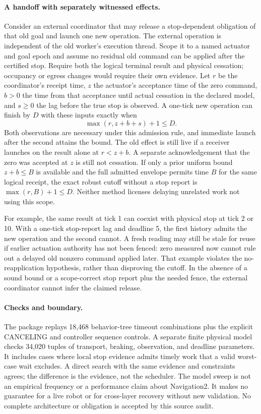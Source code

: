 \documentclass{article}
\begin{document}
\paragraph{A handoff with separately witnessed effects.}
Consider an external coordinator that may release a stop-dependent obligation of that old goal and launch one new operation. The external operation is independent of the old worker's execution thread. Scope it to a named actuator and goal epoch and assume no residual old command can be applied after the certified stop. Require both the logical terminal result and physical cessation; occupancy or egress changes would require their own evidence. Let \(r\) be the coordinator's receipt time, \(z\) the actuator's acceptance time of the zero command, \(b>0\) the time from that acceptance until actual cessation in the declared model, and \(s\ge0\) the lag before the true stop is observed. A one-tick new operation can finish by \(D\) with these inputs exactly when
\[
  \max(r,z+b+s)+1\le D.
\]
Both observations are necessary under this admission rule, and immediate launch after the second attains the bound. The old effect is still live if a receiver launches on the result alone at \(r<z+b\). A separate acknowledgement that the zero was accepted at \(z\) is still not cessation. If only a prior uniform bound \(z+b\le B\) is available and the full admitted envelope permits time \(B\) for the same logical receipt, the exact robust cutoff without a stop report is \(\max(r,B)+1\le D\). Neither method licenses delaying unrelated work not using this scope.

For example, the same result at tick 1 can coexist with physical stop at tick 2 or 10. With a one-tick stop-report lag and deadline 5, the first history admits the new operation and the second cannot. A fresh reading may still be stale for reuse if earlier actuation authority has not been fenced: zero measured now cannot rule out a delayed old nonzero command applied later. That example violates the no-reapplication hypothesis, rather than disproving the cutoff. In the absence of a sound bound or a scope-correct stop report plus the needed fence, the external coordinator cannot infer the claimed release.

\paragraph{Checks and boundary.}
The package replays 18,468 behavior-tree timeout combinations plus the explicit CANCELING and controller sequence controls. A separate finite physical model checks 34,020 tuples of transport, braking, observation, and deadline parameters. It includes cases where local stop evidence admits timely work that a valid worst-case wait excludes. A direct search with the same evidence and constraints agrees; the difference is the evidence, not the scheduler. The model sweep is not an empirical frequency or a performance claim about Navigation2. It makes no guarantee for a live robot or for cross-layer recovery without new validation. No complete architecture or obligation is accepted by this source audit.
\end{document}
